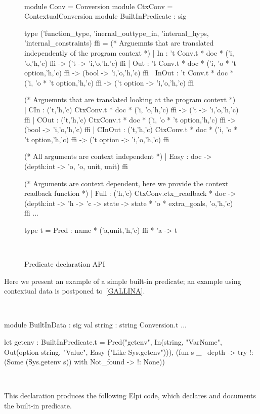 \documentclass[a4paper, 11pt]{book}
\newenvironment{ocamlcode}
  {\VerbatimEnvironment~\\\begin{ocamlbox}\begin{xocamlcode}}{\end{xocamlcode}
\end{ocamlbox}\\}
\begin{document}
\begin{figure}
\begin{ocamlcode}
module Conv = Conversion
module CtxConv = ContextualConversion
module BuiltInPredicate : sig

type ('function_type, 'inernal_outtype_in, 'internal_hyps, 'internal_constraints) ffi =
  (* Arguemnts that are translated independently of the program context *)
  | In    : 't Conv.t * doc * ('i, 'o,'h,'c) ffi -> ('t -> 'i,'o,'h,'c) ffi
  | Out   : 't Conv.t * doc * ('i, 'o * 't option,'h,'c) ffi -> (bool -> 'i,'o,'h,'c) ffi
  | InOut : 't Conv.t * doc * ('i, 'o * 't option,'h,'c) ffi -> ('t option -> 'i,'o,'h,'c) ffi

  (* Arguemnts that are translated looking at the program context *)
  | CIn    : ('t,'h,'c) CtxConv.t * doc * ('i, 'o,'h,'c) ffi -> ('t -> 'i,'o,'h,'c) ffi
  | COut   : ('t,'h,'c) CtxConv.t * doc * ('i, 'o * 't option,'h,'c) ffi -> (bool -> 'i,'o,'h,'c) ffi
  | CInOut : ('t,'h,'c) CtxConv.t * doc * ('i, 'o * 't option,'h,'c) ffi -> ('t option -> 'i,'o,'h,'c) ffi

  (* All arguments are context independent *)
  | Easy : doc -> (depth:int -> 'o, 'o, unit, unit) ffi

  (* Arguments are context dependent, here we provide the context readback function *)
  | Full : ('h,'c) CtxConv.ctx_readback * doc ->
     (depth:int -> 'h -> 'c -> state ->
        state * 'o * extra_goals, 'o,'h,'c) ffi
  ...

type t = Pred : name * ('a,unit,'h,'c) ffi * 'a -> t
\end{ocamlcode}
\caption{Predicate declaration API\label{fig:ffi}}
\end{figure}


Here we present an example of a simple built-in predicate; an example using
contextual data is postponed to~\cref{GALLINA}.

\begin{ocamlcode}
  module BuiltInData : sig
    val string : string Conversion.t
  ...

  let getenv : BuiltInPredicate.t =
    Pred("getenv",
      In(string,  "VarName",
      Out(option string, "Value",
      Easy ("Like Sys.getenv"))),
       (fun s _ ~depth ->
          try !:(Some (Sys.getenv s))   %
          with Not_found -> !: None))   %
\end{ocamlcode}

\noindent
This declaration produces the following Elpi code, which declares and
documents the built-in predicate.
\end{document}
